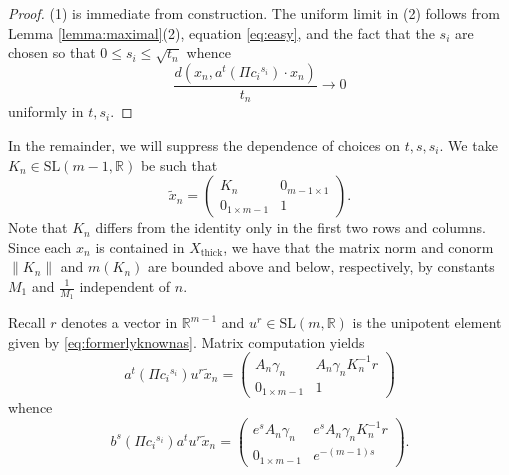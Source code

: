 \documentclass[10pt,reqno]{amsart}
\theoremstyle{Theorem}
\theoremstyle{definition}
\newtheorem{remark}[theorem]{Remark}
\theoremstyle{remark}
\newcommand{\td}{\tilde}
\newcommand{\R}{\mathbb {R}}
\newcommand{\Xt}{X_{\mathrm{thick}}}
\newcommand{\Sl}{\mathrm{SL}}
\def\blue{}
\begin{document}

\begin{proof}(1) is immediate from construction.  The uniform limit in (2) follows from Lemma \ref{lemma:maximal}(2), equation \eqref{eq:easy}, and the fact that the  $s_i$ are chosen so that $0\leq s_i \leq \sqrt{t_n}$ whence $$\frac{d(  x_n , a^t  (\Pi {c_i}^{s_i}) \cdot   x_n )}{t_n}\to 0$$ uniformly in $t, s_i$.
\end{proof}

In the remainder, we will suppress the dependence of  choices on $t, s, s_i$.
We take  $K_n \in \Sl(m-1, \R)$ be such that
\[ \td x_n =
\begin{pmatrix}
  K_n & 0_{m-1 \times 1} \\ 0_{1\times m-1} & 1
\end{pmatrix}.
\]
{\blue Note that $K_n$ differs from the identity only in the first two rows and columns.}
Since each $x_n$ is contained in  $  \Xt$,  we have that the matrix norm  and conorm  $\|K_n\|$ and $m(K_n)$ are bounded above and below, respectively,  by   constants $M_1$ and $\frac 1 {M_1}$ independent of $n$.

Recall $r$ denotes a vector in $\R^{m-1}$ and $u^r\in \Sl(m,\R)$ is the unipotent element given by \eqref{eq:formerlyknownas}.
Matrix computation yields
\[ a^t  (\Pi {c_i}^{s_i})u^r \td  x_n =
\begin{pmatrix}
  A_n\gamma_n & A_n\gamma_{n}K_{n}^{-1}r \\ 0_{1\times m-1} & 1
\end{pmatrix}
\]
whence
\[ b^{s}(\Pi {c_i}^{s_i})a^tu^r \td x_n =
\begin{pmatrix}
  e^{s}A_n\gamma_n & e^{s}A_n\gamma_nK_{n}^{-1}r \\ 0_{1\times m-1} & e^{-(m-1)s}
\end{pmatrix}.
\]
\end{document}
